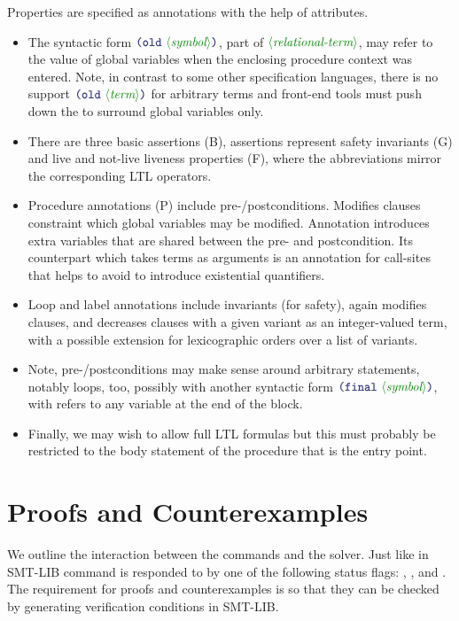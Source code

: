 \documentclass[runningheads]{llncs}
\begin{document}
\noindent
Properties are specified as annotations with the help of attributes.
\begin{itemize}
\item The syntactic form $\LP\terminal{old}~\nonterminal{symbol}\RP$,
      part of $\nonterminal{relational-term}$,
      may refer to the value of global variables
      when the enclosing procedure context was entered.
      Note, in contrast to some other specification languages,
      there is no support $\LP\terminal{old}~\nonterminal{term}\RP$
      for arbitrary terms and front-end tools must push down
      the  to surround global variables only.
\item There are three basic assertions (B), assertions represent safety invariants (G)
      and live and not-live liveness properties (F),
      where the abbreviations mirror the corresponding LTL operators.
\item Procedure annotations (P) include pre-/postconditions.
      Modifies clauses constraint which global variables may be modified.
      Annotation  introduces extra variables that are 
      shared between the pre- and postcondition.
      Its counterpart which takes terms as arguments is an annotation
      for call-sites that helps to avoid to introduce existential quantifiers.
\item Loop and label annotations include invariants (for safety),
      again modifies clauses,
      and decreases clauses with a given variant as an integer-valued term,
      with a possible extension for lexicographic orders
      over a list of variants.
\item Note, pre-/postconditions may make sense around arbitrary statements,
      notably loops,
      too, possibly with another syntactic form $\LP\terminal{final}~\nonterminal{symbol}\RP$,
      with refers to any variable at the end of the block.
\item Finally, we may wish to allow full LTL formulas
      but this must probably be restricted to the body statement
      of the procedure that is the entry point.
\end{itemize}

\section{Proofs and Counterexamples}

We outline the interaction between the commands and the solver.
Just like in SMT-LIB  command is responded
to by one of the following status flags:
, , and .
The requirement for proofs and counterexamples is so that
they can be checked by generating verification conditions in SMT-LIB.
\end{document}
